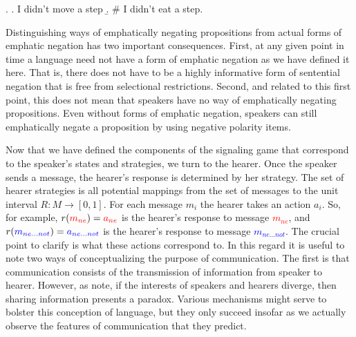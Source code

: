 \documentclass[linguex]{sp}
\theoremstyle{definition} \newtheorem{definition}{Definition}
\begin{document}
\ex. \a. I didn't move a step
       \b. \# I didn't eat a step.

Distinguishing ways of emphatically negating propositions from actual forms of emphatic negation has two important consequences. First, at any given point in time a language need not have a form of emphatic negation as we have defined it here. That is, there does not have to be a highly informative form of sentential negation that is free from selectional restrictions. Second, and related to this first point, this does not mean that speakers have no way of emphatically negating propositions. Even without forms of emphatic negation, speakers can still emphatically negate a proposition by using negative polarity items.

Now that we have defined the components of the signaling game that correspond to the speaker's states and strategies, we turn to the hearer.  Once the speaker sends a message, the hearer's response is determined by her strategy. The set of hearer strategies is all potential mappings from the set of messages to the unit interval $R : M \rightarrow [0,1]$. For each message $m_i$ the hearer takes an action $a_i$. So, for example, $r(\textcolor{red}{m_{ne}}) = \textcolor{red}{a_{ne}}$ is the hearer's response to message \emph{\textcolor{red}{$m_{ne}$}}, and  $r(\textcolor{blue}{m_{ne...not}}) = \textcolor{blue}{a_{ne...not}}$ is the hearer's response to message \emph{\textcolor{blue}{$m_{ne...not}$}}. The crucial point to clarify is what these actions correspond to. In this regard it is useful to note two ways of conceptualizing the purpose of communication. The first is that communication consists of the transmission of information from speaker to hearer. However, as  \cite{franke-etal:2012} note,  if the interests of speakers and hearers diverge, then sharing information presents a paradox. Various mechanisms might serve to bolster this conception of language, but they only succeed insofar as we actually observe the features of communication that they predict.

\end{document}

